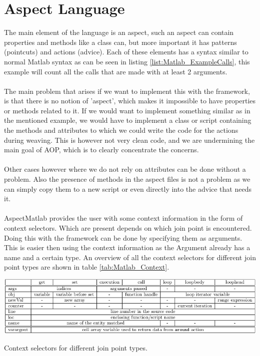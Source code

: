 \documentclass[a4paper]{report}
\begin{document}
\section{Aspect Language}
The main element of the language is an aspect, such an aspect can contain properties and methods like a class can, but more important it has patterns (pointcuts) and actions (advice). Each of these elements has a syntax similar to normal Matlab syntax as can be seen in listing \ref{list:Matlab_ExampleCalls}, this example will count all the calls that are made with at least 2 arguments.\\
\\
The main problem that arises if we want to implement this with the framework, is that there is no notion of 'aspect', which makes it impossible to have properties or methods related to it. If we would want to implement something similar as in the mentioned example, we would have to implement a class or script containing the methods and attributes to which we could write the code for the actions during weaving. This is however not very clean code, and we are undermining the main goal of AOP, which is to clearly concentrate the concerns.\\
\\
Other cases however where we do not rely on attributes can be done without a problem. Also the presence of methods in the aspect files is not a problem as we can simply copy them to a new script or even directly into the advice that needs it.\\
\\
AspectMatlab provides the user with some context information in the form of context selectors. Which are present depends on which join point is encountered. Doing this with the framework can be done by specifying them as arguments. This is easier then using the context information as the Argument already has a name and a certain type. An overview of all the context selectors for different join point types are shown in table \ref{tab:Matlab_Context}.
\begin{table}
\includegraphics[width=\textwidth]{images/Languages/Matlab_Context.png}
\caption{Context selectors for different join point types.}
\label{tab:Matlab_Context}
\end{table}
\end{document}
